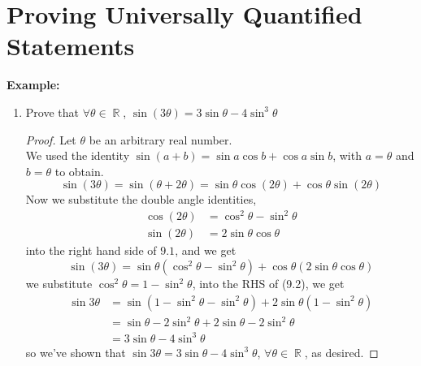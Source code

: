 \documentclass[11pt, a4paper]{memoir}
\DeclareMathOperator{\R}{{\mathbb{R}}}
\theoremstyle{change}
\theoremstyle{plain}
\theoremstyle{nonumberplain}
\newtheorem{proof}{Proof}
\numberwithin{equation}{section}
\begin{document}
\section{Proving Universally Quantified Statements}
\textbf{Example:}
\begin{enumerate}
    \item Prove that $\forall \theta \in \R$, $\sin(3 \theta) = 3\sin \theta - 4\sin^3 \theta$
    \begin{proof}
        Let $\theta$ be an arbitrary real number. \\
        We used the identity $\sin(a + b) = \sin a \cos b + \cos a \sin b$, with $a = \theta$ and $b = \theta$ to obtain.
        \begin{equation}
            \sin (3 \theta) = \sin (\theta + 2\theta) = \sin \theta \cos(2 \theta) + \cos \theta \sin(2 \theta)
        \end{equation}
        Now we substitute the double angle identities, 
        \begin{align*}
            \cos(2 \theta) &= \cos^2 \theta - \sin^2 \theta\\
            \sin(2 \theta) &= 2\sin\theta \cos \theta
        \end{align*}
        into the right hand side of $9.1$, and we get
        \begin{equation}
            \sin(3 \theta) = \sin \theta(\cos^2 \theta - \sin^2 \theta) + \cos \theta (2 \sin \theta \cos \theta)
        \end{equation}
        we substitute $\cos^2 \theta = 1 - \sin^2 \theta$, into the RHS of (9.2), we get 
        \begin{align*}
            \sin 3\theta &= \sin(1 - \sin^2\theta - \sin^2 \theta) + 2 \sin \theta(1 - \sin^2 \theta)\\
                         &= \sin \theta - 2 \sin^2 \theta + 2 \sin \theta - 2 \sin^2 \theta\\
                         &= 3 \sin \theta - 4 \sin^3 \theta
        \end{align*}
        so we've shown that $\sin 3 \theta = 3 \sin \theta - 4 \sin^3 \theta$, $\forall \theta \in \R$, as desired.
    \end{proof}
\end{enumerate}
\end{document}
